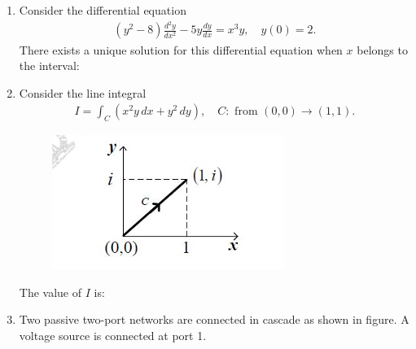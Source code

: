 \documentclass[journal,12pt,onecolumn]{IEEEtran}
\theoremstyle{remark}
\begin{document}
\begin{enumerate}
\item Consider the differential equation
\begin{align*}
    (y^2 - 8)\frac{d^2y}{dx^2} - 5y\frac{dy}{dx} = x^3y, \quad y(0)=2.
\end{align*}
There exists a unique solution for this differential equation when $x$ belongs to the interval:
\begin{enumerate}
\end{enumerate}

\item Consider the line integral 
\begin{align*}
    I = \int_C (x^2y \, dx + y^2 \, dy), \quad C: \text{ from } (0,0) \to (1,1).
\end{align*}
\begin{figure}[H]
    \centering
    \includegraphics[width=0.5\columnwidth]{figs/28.png}
    \caption{}
    \label{fig:placeholder}
\end{figure}
The value of $I$ is:
\begin{enumerate}

\end{enumerate}



\item Two passive two-port networks are connected in cascade as shown in figure.  
A voltage source is connected at port 1.


\end{enumerate}
\end{document}
